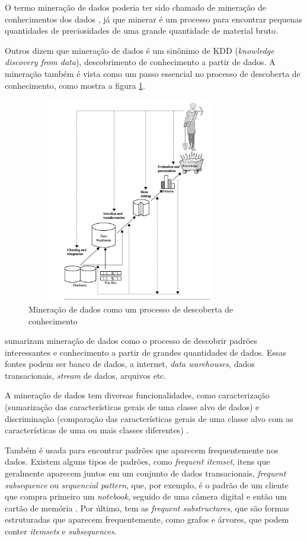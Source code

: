 O termo mineração de dados poderia ter sido chamado de mineração de conhecimentos dos dados \citep{jmj}, já que minerar é um processo para encontrar pequenas quantidades de preciosidades de uma grande quantidade de material bruto. 

Outros dizem que mineração de dados é um sinônimo de KDD (\textit{knowledge discovery from data}), descobrimento de conhecimento a partir de dados. A mineração também é vista como um passo essencial no processo de descoberta de conhecimento, como mostra a figura \ref{kdd}. 

\begin{figure}[H]
\centering
\includegraphics[height=9cm, width=9cm]{imagens/kdd.png}
\caption{Mineração de dados como um processo de descoberta de conhecimento \citep{jmj}}
\label{kdd}
\end{figure}

\citeauthor{jmj} sumarizam mineração de dados como o processo de descobrir padrões interessantes e conhecimento a partir de grandes quantidades de dados. Essas fontes podem ser banco de dados, a internet, \textit{data warehouses}, dados transacionais, \textit{stream} de dados, arquivos etc. 

A mineração de dados tem diversas funcionalidades, como caracterização (sumarização das características gerais de uma classe alvo de dados) e discriminação (comparação das características gerais de uma classe alvo com as características de uma ou mais classes diferentes) \citep{jmj}. 

Também é usada para encontrar padrões que aparecem frequentemente nos dados. Existem alguns tipos de padrões, como \textit{frequent itemset}, itens que geralmente aparecem juntos em um conjunto de dados transacionais, \textit{frequent subsequence} ou \textit{sequencial pattern}, que, por exemplo, é o padrão de um cliente que compra primeiro um \textit{notebook}, seguido de uma câmera digital e então um cartão de memória \citep{jmj}. Por último, tem as \textit{frequent substructures}, que são formas estruturadas que aparecem frequentemente, como grafos e árvores, que podem conter \textit{itemsets} e \textit{subsequences}.

